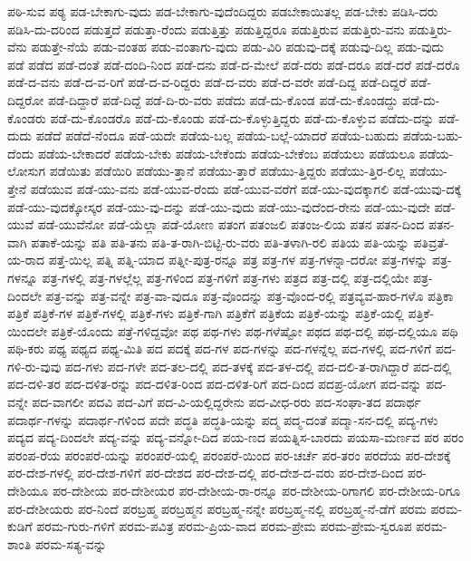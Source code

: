 {ಪಠಿ-ಸುವ
ಪಠ್ಯ
ಪಡ-ಬೇಕಾಗು-ವುದು
ಪಡ-ಬೇಕಾಗು-ವುದೆಂದಿದ್ದರು
ಪಡಬೇಕಾಯಿತಲ್ಲ
ಪಡ-ಬೇಕು
ಪಡಿಸಿ-ದರು
ಪಡಿಸಿ-ದು-ದರಿಂದ
ಪಡುತ್ತದೆ
ಪಡುತ್ತಾ-ರೆಂದು
ಪಡುತ್ತಿತ್ತು
ಪಡುತ್ತಿದ್ದರೂ
ಪಡುತ್ತಿರುವ
ಪಡುತ್ತಿರು-ವನು
ಪಡುತ್ತಿರು-ವೆನು
ಪಡುತ್ತೇ-ನೆಯೆ
ಪಡು-ವಂತಹ
ಪಡು-ವಂತಾಗು-ವುದು
ಪಡು-ವಿರಿ
ಪಡುವು-ದಕ್ಕೆ
ಪಡುವು-ದಿಲ್ಲ
ಪಡು-ವುದು
ಪಡೆ
ಪಡೆದ
ಪಡೆ-ದಂತೆ
ಪಡೆ-ದಂದಿ-ನಿಂದ
ಪಡೆ-ದನು
ಪಡೆ-ದ-ಮೇಲೆ
ಪಡೆ-ದರು
ಪಡೆ-ದರೂ
ಪಡೆ-ದರೆ
ಪಡೆ-ದರೊ
ಪಡೆ-ದ-ವನು
ಪಡೆ-ದ-ವ-ರಿಗೆ
ಪಡೆ-ದ-ವ-ರಿದ್ದರು
ಪಡೆ-ದ-ವರು
ಪಡೆ-ದ-ವರೇ
ಪಡೆ-ದಿದ್ದ
ಪಡೆ-ದಿದ್ದರೆ
ಪಡೆ-ದಿದ್ದರೋ
ಪಡೆ-ದಿದ್ದಾರೆ
ಪಡೆ-ದಿದ್ದೆ
ಪಡೆ-ದಿ-ರು-ವರು
ಪಡೆದು
ಪಡೆ-ದು-ಕೊಂಡ
ಪಡೆ-ದು-ಕೊಂಡದ್ದು
ಪಡೆ-ದು-ಕೊಂಡರು
ಪಡೆ-ದು-ಕೊಂಡರೊ
ಪಡೆ-ದು-ಕೊಂಡು
ಪಡೆ-ದು-ಕೊಳ್ಳುತ್ತಿದ್ದರು
ಪಡೆ-ದು-ಕೊಳ್ಳುವ
ಪಡೆದು-ದನ್ನು
ಪಡೆ-ದುದು
ಪಡೆದೆ
ಪಡೆದೆ-ನೆಂದೂ
ಪಡೆ-ಯದೇ
ಪಡೆಯ-ಬಲ್ಲ
ಪಡೆಯ-ಬಲ್ಲೆ-ಯಾದರೆ
ಪಡೆಯ-ಬಹುದು
ಪಡೆಯ-ಬಹು-ದೆಂದು
ಪಡೆಯ-ಬೇಕಾದರೆ
ಪಡೆಯ-ಬೇಕು
ಪಡೆಯ-ಬೇಕೆಂದು
ಪಡೆಯ-ಬೇಕೆಂಬ
ಪಡೆಯಲು
ಪಡೆಯಲೂ
ಪಡೆಯ-ಲೋಸುಗ
ಪಡೆಯಿತು
ಪಡೆಯಿರಿ
ಪಡೆಯು-ತ್ತಾನೆ
ಪಡೆಯು-ತ್ತಾರೆ
ಪಡೆಯು-ತ್ತಿದ್ದರು
ಪಡೆಯು-ತ್ತಿರ-ಲಿಲ್ಲ
ಪಡೆಯು-ತ್ತೇನೆ
ಪಡೆಯುವ
ಪಡೆ-ಯು-ವನು
ಪಡೆ-ಯುವ-ರೆಂದು
ಪಡೆ-ಯುವ-ವರೆಗೆ
ಪಡೆ-ಯು-ವುದಕ್ಕಾಗಲಿ
ಪಡೆ-ಯುವು-ದಕ್ಕೆ
ಪಡೆ-ಯು-ವುದಕ್ಕೋಸ್ಕರ
ಪಡೆ-ಯು-ವು-ದನ್ನು
ಪಡೆ-ಯು-ವುದು
ಪಡೆ-ಯು-ವುದೆಂದ-ರೇನು
ಪಡೆ-ಯು-ವುದೇ
ಪಡೆ-ಯುವೆ
ಪಡೆ-ಯುವೆನೋ
ಪಡೆ-ಯೆಲ್ಲಾ
ಪಡೆ-ಯೋಣ
ಪತಂಗ
ಪತಂಜಲಿ
ಪತಂಜ-ಲಿಯ
ಪತನ
ಪತನ-ದಿಂದ
ಪತನ-ವಾಗಿ
ಪತಾಕೆ-ಯನ್ನು
ಪತಿ
ಪತಿ-ತನು
ಪತಿ-ತ-ರಾಗಿ-ಬಿಟ್ಟಿ-ರು-ವರು
ಪತಿ-ತಳಾಗಿ-ರಲಿ
ಪತಿಯ
ಪತಿ-ಯನ್ನು
ಪತಿವ್ರತೆ-ಯ-ರಾದ
ಪತ್ತೆ-ಯಿಲ್ಲ
ಪತ್ನಿ
ಪತ್ನಿ-ಯಾದ
ಪತ್ನೀ-ಪುತ್ರ-ರನ್ನೂ
ಪತ್ರ
ಪತ್ರ-ಗಳ
ಪತ್ರ-ಗಳನ್ನಾ-ದರೋ
ಪತ್ರ-ಗಳನ್ನು
ಪತ್ರ-ಗಳನ್ನೂ
ಪತ್ರ-ಗಳಲ್ಲಿ
ಪತ್ರ-ಗಳಲ್ಲೆಲ್ಲ
ಪತ್ರ-ಗಳಿಂದ
ಪತ್ರ-ಗಳಿಗೆ
ಪತ್ರ-ಗಳು
ಪತ್ರದ
ಪತ್ರ-ದಲ್ಲಿ
ಪತ್ರ-ದಲ್ಲಿಯೇ
ಪತ್ರ-ದಿಂದಲೇ
ಪತ್ರ-ವನ್ನು
ಪತ್ರ-ವನ್ನೇ
ಪತ್ರ-ವಾ-ವುದೂ
ಪತ್ರ-ವೊಂದನ್ನು
ಪತ್ರ-ವೊಂದ-ರಲ್ಲಿ
ಪತ್ರವ್ಯವ-ಹಾರ-ಗಳೊ
ಪತ್ರಿಕಾ
ಪತ್ರಿಕೆ
ಪತ್ರಿಕೆ-ಗಳ
ಪತ್ರಿಕೆ-ಗಳಲ್ಲಿ
ಪತ್ರಿಕೆ-ಗಳು
ಪತ್ರಿಕೆ-ಗಾಗಿ
ಪತ್ರಿಕೆಗೆ
ಪತ್ರಿಕೆಯ
ಪತ್ರಿಕೆ-ಯನ್ನು
ಪತ್ರಿಕೆ-ಯಲ್ಲಿ
ಪತ್ರಿಕೆ-ಯಿಂದಲೇ
ಪತ್ರಿಕೆ-ಯೊಂದು
ಪತ್ರೆ-ಗಳಿದ್ದವೋ
ಪಥ
ಪಥ-ಗಳು
ಪಥ-ಗಳೆಷ್ಟೋ
ಪಥದ
ಪಥ-ದಲ್ಲಿ
ಪಥ-ದಲ್ಲಿಯೂ
ಪಥಿ
ಪಥಿ-ಕರು
ಪಥ್ಯ
ಪಥ್ಯದ
ಪಥ್ಯ-ಮಿತಿ
ಪದ
ಪದಕ್ಕೆ
ಪದ-ಗಳ
ಪದ-ಗಳನ್ನು
ಪದ-ಗಳನ್ನೆಲ್ಲ
ಪದ-ಗಳಲ್ಲಿ
ಪದ-ಗಳಿಗೆ
ಪದ-ಗಳಿ-ರು-ವುವು
ಪದ-ಗಳು
ಪದ-ಗಳೇ
ಪದ-ತಲ-ದಲ್ಲಿ
ಪದ-ತಳಕ್ಕೆ
ಪದ-ತಳ-ದಲ್ಲಿ
ಪದ-ದಲಿ-ತ-ರಾಗಿದ್ದಾರೆ
ಪದ-ದಲ್ಲಿ
ಪದ-ದಳಿ-ತರ
ಪದ-ದಳಿತ-ರನ್ನು
ಪದ-ದಳಿತ-ರಿಂದ
ಪದ-ದಳಿತ-ರಿಗೆ
ಪದ-ದಿಂದ
ಪದಪ್ರ-ಯೋಗ
ಪದ-ವನ್ನು
ಪದ-ವನ್ನೇ
ಪದ-ವಾಗಲೀ
ಪದವಿ
ಪದ-ವಿಗೆ
ಪದ-ವಿ-ಯಲ್ಲಿದ್ದರೇನು
ಪದ-ವೀಧ-ರರು
ಪದ-ಸಂಘಾ-ತದ
ಪದಾರ್ಥ
ಪದಾರ್ಥ-ಗಳನ್ನು
ಪದಾರ್ಥ-ಗಳಿಂದ
ಪದೇ
ಪದ್ಧತಿ
ಪದ್ಧತಿ-ಯನ್ನು
ಪದ್ಮ
ಪದ್ಮ-ದಂತೆ
ಪದ್ಮಾ-ಸನ-ದಲ್ಲಿ
ಪದ್ಯ-ಗಳು
ಪದ್ಯದ
ಪದ್ಯ-ದಿಂದಲೇ
ಪದ್ಯ-ವನ್ನು
ಪದ್ಯ-ವನ್ನೋ-ದಿದ
ಪಯ-ಣದ
ಪಯತ್ನಿಸ-ಬಾರದು
ಪಯಸಾ-ಮರ್ಣವ
ಪರ
ಪರಂ
ಪರಂಪ-ರೆಯ
ಪರಂಪರೆ-ಯನ್ನು
ಪರಂಪರೆ-ಯಲ್ಲಿ
ಪರಂಪರೆ-ಯಿಂದ
ಪರ-ಚರ್ಚೆ
ಪರ-ತರಂ
ಪರದೆಯ
ಪರ-ದೇಶಕ್ಕೆ
ಪರ-ದೇಶ-ಗಳಲ್ಲಿ
ಪರ-ದೇಶ-ಗಳಿಗೆ
ಪರ-ದೇಶದ
ಪರ-ದೇಶ-ದಲ್ಲಿ
ಪರ-ದೇಶ-ದ-ವರು
ಪರ-ದೇಶ-ದಿಂದ
ಪರ-ದೇಶಿಯೂ
ಪರ-ದೇಶೀಯ
ಪರ-ದೇಶೀಯರ
ಪರ-ದೇಶೀಯ-ರಾ-ರನ್ನೂ
ಪರ-ದೇಶೀಯ-ರಿಗಾಗಲಿ
ಪರ-ದೇಶೀಯ-ರಿಗೂ
ಪರ-ದೇಶೀಯರು
ಪರ-ನಿಂದೆ
ಪರಬ್ರಹ್ಮ
ಪರಬ್ರಹ್ಮನ
ಪರಬ್ರಹ್ಮ-ನನ್ನೇ
ಪರಬ್ರಹ್ಮ-ನಲ್ಲಿ
ಪರಬ್ರಹ್ಮ-ನೆ-ಡೆಗೆ
ಪರಮ
ಪರಮ-ಕುಡಿಗೆ
ಪರಮ-ಗುರು-ಗಳಿಗೆ
ಪರಮ-ಪವಿತ್ರ
ಪರಮ-ಪ್ರಿಯ-ವಾದ
ಪರಮ-ಪ್ರೇಮ
ಪರಮ-ಪ್ರೇಮ-ಸ್ವರೂಪ
ಪರಮ-ಶಾಂತಿ
ಪರಮ-ಸತ್ಯ-ವನ್ನು
}
